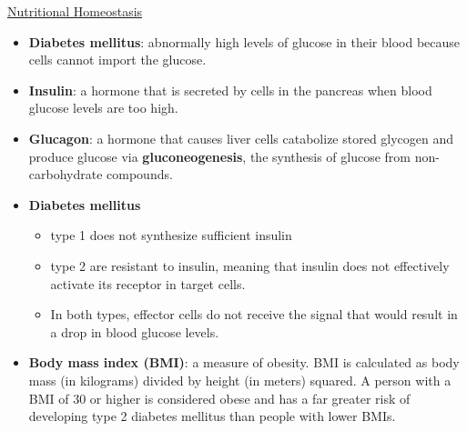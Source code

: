 \documentclass[12pt,letterpaper]{article}
\begin{document}
\hypertarget{41.4}{}
\begin{secbox}{\hyperlink{41}{Nutritional Homeostasis}}{
    \begin{itemize}
        \item \textbf{Diabetes mellitus}: abnormally high levels of glucose in their blood because cells cannot import the glucose. 
        \item \textbf{Insulin}: a hormone that is secreted by cells in the pancreas when blood glucose levels are too high.
        \item \textbf{Glucagon}: a hormone that causes liver cells catabolize stored glycogen and produce glucose via \textbf{gluconeogenesis}, the synthesis of glucose from non-carbohydrate compounds.
        \item \textbf{Diabetes mellitus}
            \begin{itemize} 
                \item type 1 does not synthesize sufficient insulin 
                \item type 2 are resistant to insulin, meaning that insulin does not effectively activate its receptor in target cells. 
                \item In both types, effector cells do not receive the signal that would result in a drop in blood glucose levels.
            \end{itemize}
        \item \textbf{Body mass index (BMI)}: a measure of obesity. BMI is calculated as body mass (in kilograms) divided by height (in meters) squared. A person with a BMI of 30 or higher is considered obese and has a far greater risk of developing type 2 diabetes mellitus than people with lower BMIs.
    \end{itemize}


}
\end{secbox}
\end{document}
